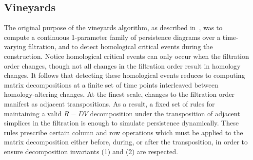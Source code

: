 \documentclass{siamart190516}
\begin{document}
\subsection{Vineyards}\label{sec:vineyards}
The original purpose of the vineyards algorithm, as described in~\cite{cohen2006vines}, was to compute a continuous 1-parameter family of persistence diagrams over a time-varying filtration, and to detect homological critical events during the construction.
Notice homological critical events can only occur when the filtration order changes, though not all changes in the filtration order result in homology changes.
It follows that detecting these homological events reduces to computing matrix decompositions at a finite set of time points interleaved between homology-altering changes. 
At the finest scale, changes to the filtration order manifest as adjacent transpositions. 
As a result, a fixed set of rules for maintaining a valid $R = D V$ decomposition under the transposition of adjacent simplices in the filtration is enough to simulate persistence dynamically. 
These rules prescribe certain column and row operations which must be applied to the matrix decomposition either before, during, or after the transposition, in order to ensure decomposition invariants (1) and (2) are respected.   
\end{document}
